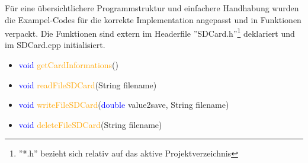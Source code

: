 Für eine übersichtlichere Programmstruktur und einfachere Handhabung wurden die Exampel-Codes für die korrekte Implementation angepasst und in Funktionen verpackt. Die Funktionen sind extern im Headerfile ''SDCard.h''\footnote{ ''*.h'' bezieht sich relativ auf das aktive Projektverzeichnis} deklariert und im SDCard.cpp initialisiert.
\begin{itemize}
\item \textcolor{blue}{void} \textcolor{orange}{getCardInformations}()
\item \textcolor{blue}{void} \textcolor{orange}{readFileSDCard}(\textcolor{Dandelion}{String} filename)
\item \textcolor{blue}{void} \textcolor{orange}{writeFileSDCard}(\textcolor{blue}{double} value2save, \textcolor{Dandelion}{String} filename)
\item \textcolor{blue}{void} \textcolor{orange}{deleteFileSDCard}(\textcolor{Dandelion}{String} filename)
\end{itemize}
